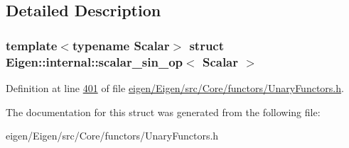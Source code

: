 \subsection{Detailed Description}
\subsubsection*{template$<$typename Scalar$>$\newline
struct Eigen\+::internal\+::scalar\+\_\+sin\+\_\+op$<$ Scalar $>$}



Definition at line \hyperlink{eigen_2_eigen_2src_2_core_2functors_2_unary_functors_8h_source_l00401}{401} of file \hyperlink{eigen_2_eigen_2src_2_core_2functors_2_unary_functors_8h_source}{eigen/\+Eigen/src/\+Core/functors/\+Unary\+Functors.\+h}.



The documentation for this struct was generated from the following file\+:\begin{DoxyCompactItemize}
\item 
eigen/\+Eigen/src/\+Core/functors/\+Unary\+Functors.\+h\end{DoxyCompactItemize}
